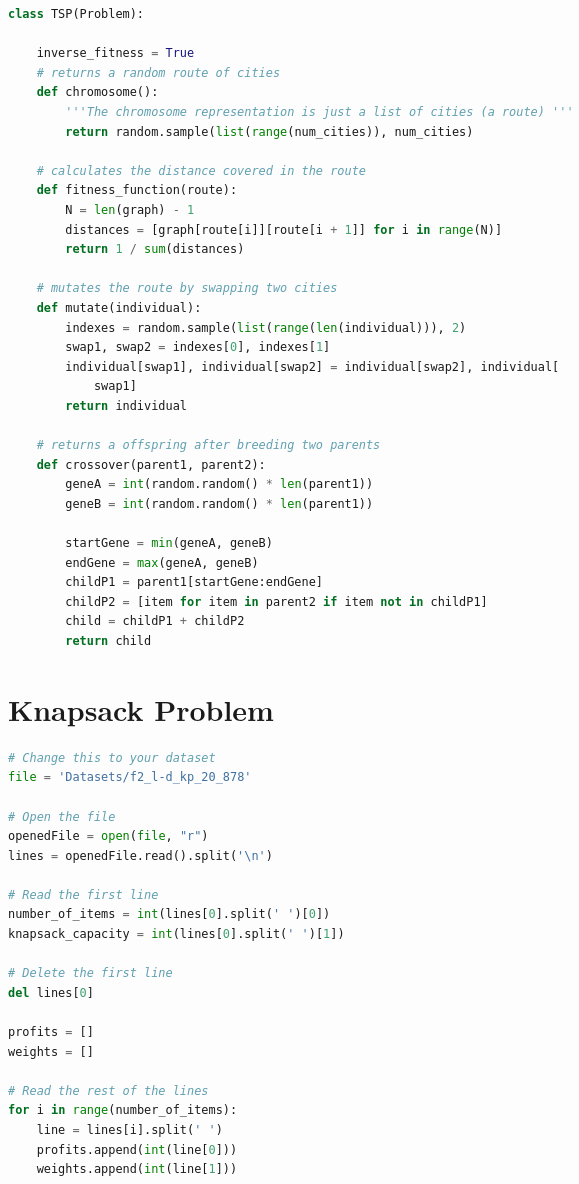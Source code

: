 \documentclass[12pt]{report} %
\begin{document}
\begin{changemargin}{-3cm}{-2cm}

	\begin{lstlisting}[language=python, caption= {TSP class}, captionpos=b]
class TSP(Problem):

    inverse_fitness = True
    # returns a random route of cities
    def chromosome():
        '''The chromosome representation is just a list of cities (a route) '''
        return random.sample(list(range(num_cities)), num_cities)

    # calculates the distance covered in the route
    def fitness_function(route):
        N = len(graph) - 1
        distances = [graph[route[i]][route[i + 1]] for i in range(N)]
        return 1 / sum(distances)

    # mutates the route by swapping two cities
    def mutate(individual):
        indexes = random.sample(list(range(len(individual))), 2)
        swap1, swap2 = indexes[0], indexes[1]
        individual[swap1], individual[swap2] = individual[swap2], individual[
            swap1]
        return individual

    # returns a offspring after breeding two parents
    def crossover(parent1, parent2):
        geneA = int(random.random() * len(parent1))
        geneB = int(random.random() * len(parent1))

        startGene = min(geneA, geneB)
        endGene = max(geneA, geneB)
        childP1 = parent1[startGene:endGene]
        childP2 = [item for item in parent2 if item not in childP1]
        child = childP1 + childP2
        return child


\end{lstlisting}
\end{changemargin}


\section{Knapsack Problem}

\begin{changemargin}{-3cm}{-2cm}

	\begin{lstlisting}[language=python, caption= {Storing the dataset in a list}, captionpos=b]
# Change this to your dataset
file = 'Datasets/f2_l-d_kp_20_878'

# Open the file
openedFile = open(file, "r")
lines = openedFile.read().split('\n')

# Read the first line
number_of_items = int(lines[0].split(' ')[0])
knapsack_capacity = int(lines[0].split(' ')[1])

# Delete the first line
del lines[0]

profits = []
weights = []

# Read the rest of the lines
for i in range(number_of_items):
    line = lines[i].split(' ')
    profits.append(int(line[0]))
    weights.append(int(line[1]))
\end{lstlisting}
\end{changemargin}
\end{document}
